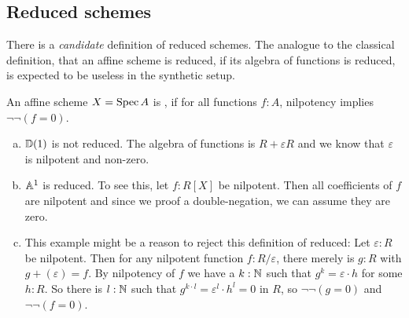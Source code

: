 
\subsection{Reduced schemes}

There is a \emph{candidate} definition of reduced schemes.
The analogue to the classical definition, that an affine scheme is reduced,
if its algebra of functions is reduced, is expected to be useless in the synthetic setup.

\begin{definition}
  An affine scheme $X=\operatorname{Spec} A$ is ,
  if for all functions $f:A$, nilpotency implies $\neg\neg (f=0)$.
\end{definition}

\begin{example}
  \begin{enumerate}[(a)]
  \item $\mathbb{D}(1)$ is not reduced.
    The algebra of functions is $R+\varepsilon R$ and we know that $\varepsilon$ is nilpotent and non-zero.
  \item $\mathbb{A}^1$ is reduced. To see this, let $f:R[X]$ be nilpotent.
    Then all coefficients of $f$ are nilpotent and since we proof a double-negation,
    we can assume they are zero.
  \item This example might be a reason to reject this definition of reduced:
    Let $\varepsilon:R$ be nilpotent.
    Then for any nilpotent function $f:R/\varepsilon$, there merely is $g:R$ with $g+(\varepsilon)=f$.
    By nilpotency of $f$ we have a $k:\mathbb{N}$ such that $g^k=\varepsilon\cdot h$ for some $h:R$.
    So there is $l:\mathbb{N}$ such that $g^{k\cdot l}=\varepsilon^l\cdot h^l=0$ in $R$, so $\neg\neg (g=0)$ and $\neg\neg (f=0)$.
  \end{enumerate}
\end{example}

